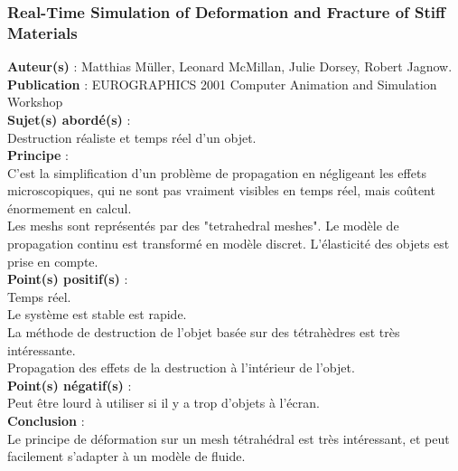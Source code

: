 \documentclass[a4paper,10pt]{article}
\begin{document}
\subsubsection{Real-Time Simulation of Deformation and Fracture of Stiff Materials}
\textbf{Auteur(s)} : Matthias Müller, Leonard McMillan, Julie Dorsey, Robert Jagnow.\\
\textbf{Publication} : EUROGRAPHICS 2001 Computer Animation and Simulation Workshop \\
\textbf{Sujet(s) abordé(s)} : \\
	Destruction réaliste et temps réel d'un objet. \\
\textbf{Principe} :\\	
	C'est la simplification d'un problème de propagation en négligeant les effets microscopiques, qui ne sont pas vraiment visibles en temps réel, mais coûtent énormement en calcul.\\
	Les meshs sont représentés par des "tetrahedral meshes". Le modèle de propagation continu est transformé en modèle discret. L'élasticité des objets est prise en compte.\\
\textbf{Point(s) positif(s)} :\\
	Temps réel.\\
	Le système est stable est rapide.\\
	La méthode de destruction de l'objet basée sur des tétrahèdres est très intéressante.\\
	Propagation des effets de la destruction à l'intérieur de l'objet.\\
\textbf{Point(s) négatif(s)} :\\
	Peut être lourd à utiliser si il y a trop d'objets à l'écran.\\
\textbf{Conclusion} :\\
	Le principe de déformation sur un mesh tétrahédral est très intéressant, et peut facilement s'adapter à un modèle de fluide.
\end{document}
